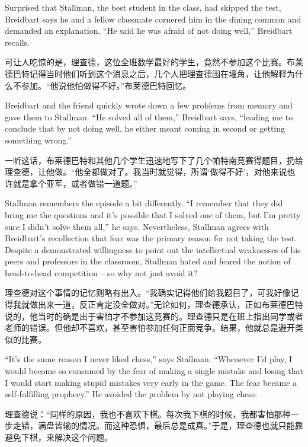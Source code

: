 \ifdefined\eng
Surprised that Stallman, the best student in the class, had skipped the test, Breidbart says he and a fellow classmate cornered him in the dining common and demanded an explanation. ``He said he was afraid of not doing well,'' Breidbart recalls.
\fi

\ifdefined\chs
可让人吃惊的是，理查德，这位全班数学最好的学生，竟然不参加这个比赛。布莱德巴特记得当时他们听到这个消息之后，几个人把理查德围在墙角，让他解释为什么不参加。``他说他怕做得不好。''布莱德巴特回忆。
\fi

\ifdefined\eng
Breidbart and the friend quickly wrote down a few problems from memory and gave them to Stallman. ``He solved all of them,'' Breidbart says, ``leading me to conclude that by not doing well, he either meant coming in second or getting something wrong.''
\fi

\ifdefined\chs
一听这话，布莱德巴特和其他几个学生迅速地写下了几个帕特南竞赛得题目，扔给理查德，让他做。``他全都做对了。我当时就觉得，所谓`做得不好'，对他来说也许就是拿个亚军，或者做错一道题。''
\fi

\ifdefined\eng
Stallman remembers the episode a bit differently. ``I remember that they did bring me the questions and it's possible that I solved one of them, but I'm pretty sure I didn't solve them all,'' he says. Nevertheless, Stallman agrees with Breidbart's recollection that fear was the primary reason for not taking the test. Despite a demonstrated willingness to point out the intellectual weaknesses of his peers and professors in the classroom, Stallman hated and feared the notion of head-to-head competition -- so why not just avoid it?
\fi

\ifdefined\chs
理查德对这个事情的记忆则略有出入。``我确实记得他们给我题目了，可我好像记得我就做出来一道，反正肯定没全做对。''无论如何，理查德承认，正如布莱德巴特说的，他当时的确是出于害怕才不参加这竞赛的。理查德只是在班上指出同学或者老师的错误。但他却不喜欢，甚至害怕参加任何正面竞争。结果，他就总是避开类似的比赛。
\fi

\ifdefined\eng
``It's the same reason I never liked chess,'' says Stallman. ``Whenever I'd play, I would become so consumed by the fear of making a single mistake and losing that I would start making stupid mistakes very early in the game. The fear became a self-fulfilling prophecy.''  He avoided the problem by not playing chess.
\fi

\ifdefined\chs
理查德说：``同样的原因，我也不喜欢下棋。每次我下棋的时候，我都害怕那种一步走错，满盘皆输的情况。而这种恐惧，最后总是成真。''于是，理查德也就只能靠避免下棋，来解决这个问题。
\fi

